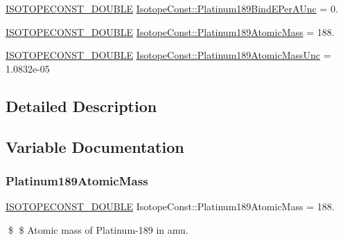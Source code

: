 \begin{DoxyCompactItemize}
\mbox{\hyperlink{group___isotope_const-_macros_ga8f45a7272ce02c0b4c65c44636ed719a}{I\+S\+O\+T\+O\+P\+E\+C\+O\+N\+S\+T\+\_\+\+D\+O\+U\+B\+LE}} \mbox{\hyperlink{group___isotope_const-_platinum-_pt189_ga416d3761e1f6b0ef42a68611435f5132}{Isotope\+Const\+::\+Platinum189\+Bind\+E\+Per\+A\+Unc}} = 0.
\item 
\mbox{\hyperlink{group___isotope_const-_macros_ga8f45a7272ce02c0b4c65c44636ed719a}{I\+S\+O\+T\+O\+P\+E\+C\+O\+N\+S\+T\+\_\+\+D\+O\+U\+B\+LE}} \mbox{\hyperlink{group___isotope_const-_platinum-_pt189_ga21bc92a2e9e25612dbe92a358a2a92af}{Isotope\+Const\+::\+Platinum189\+Atomic\+Mass}} = 188.
\item 
\mbox{\hyperlink{group___isotope_const-_macros_ga8f45a7272ce02c0b4c65c44636ed719a}{I\+S\+O\+T\+O\+P\+E\+C\+O\+N\+S\+T\+\_\+\+D\+O\+U\+B\+LE}} \mbox{\hyperlink{group___isotope_const-_platinum-_pt189_ga09473e63b9c9c2c55cf951a0273a8972}{Isotope\+Const\+::\+Platinum189\+Atomic\+Mass\+Unc}} = 1.\+0832e-\/05
\end{DoxyCompactItemize}


\subsection{Detailed Description}


\subsection{Variable Documentation}
\mbox{\label{group___isotope_const-_platinum-_pt189_ga21bc92a2e9e25612dbe92a358a2a92af}} 
\subsubsection{\texorpdfstring{Platinum189\+Atomic\+Mass}{Platinum189AtomicMass}}
{\footnotesize\ttfamily \mbox{\hyperlink{group___isotope_const-_macros_ga8f45a7272ce02c0b4c65c44636ed719a}{I\+S\+O\+T\+O\+P\+E\+C\+O\+N\+S\+T\+\_\+\+D\+O\+U\+B\+LE}} Isotope\+Const\+::\+Platinum189\+Atomic\+Mass = 188.}

\$ \$ Atomic mass of Platinum-\/189 in amu. \mbox{\label{group___isotope_const-_platinum-_pt189_ga09473e63b9c9c2c55cf951a0273a8972}} 
